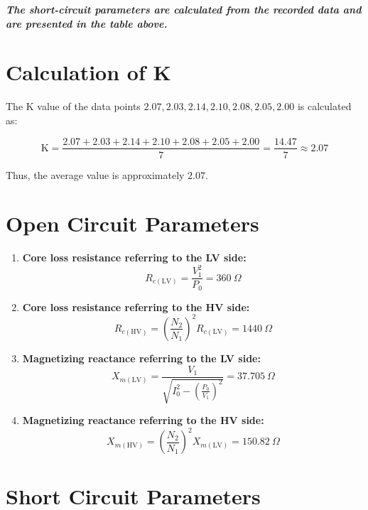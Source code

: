 \documentclass[12pt,a4paper]{report}
\begin{document}
\begin{enumerate}
    \textbf{\textit{The short-circuit parameters are calculated from the recorded data and are presented in the table above.}}
    \section{Calculation of  K}

The K value of the data points \( 2.07, 2.03, 2.14, 2.10, 2.08, 2.05, 2.00 \) is calculated as:

\[
\text{K} = \frac{2.07 + 2.03 + 2.14 + 2.10 + 2.08 + 2.05 + 2.00}{7} = \frac{14.47}{7} \approx 2.07
\]

Thus, the average value is approximately \( 2.07 \).

    \section{Open Circuit Parameters}

\begin{enumerate}
    \item \textbf{Core loss resistance referring to the LV side:}
    \begin{equation}
        R_{c(\text{LV})} = \frac{V_1^2}{P_0} = 360 \ \Omega
    \end{equation}

    \item \textbf{Core loss resistance referring to the HV side:}
    \begin{equation}
        R_{c(\text{HV})} = \left( \frac{N_2}{N_1} \right)^2 R_{c(\text{LV})} = 1440 \ \Omega
    \end{equation}

    \item \textbf{Magnetizing reactance referring to the LV side:}
    \begin{equation}
        X_{m(\text{LV})} = \frac{V_1}{\sqrt{I_0^2 - \left( \frac{P_0}{V_1} \right)^2}} = 37.705 \ \Omega
    \end{equation}

    \item \textbf{Magnetizing reactance referring to the HV side:}
    \begin{equation}
        X_{m(\text{HV})} = \left( \frac{N_2}{N_1} \right)^2 X_{m(\text{LV})} = 150.82 \ \Omega
    \end{equation}
\end{enumerate}

    \section{Short Circuit Parameters}


\end{enumerate}
\end{document}

